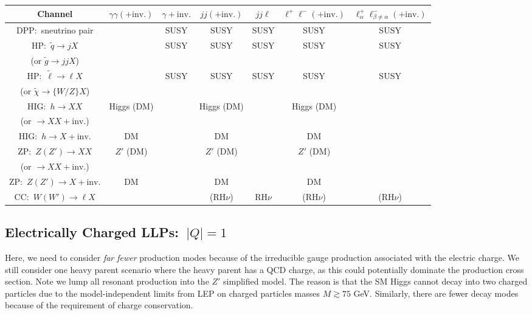 \begin{center}
\begin{tabular}{ |c|c|c|c|c|c|c| } 
 \hline
Channel & $\gamma\gamma(+\mathrm{inv.})$ & $\gamma+\mathrm{inv.}$ & $jj(+\mathrm{inv.})$ & $jj\ell$ & $\ell^+\ell^-(+\mathrm{inv.})$ & $\ell_\alpha^+\ell_{\beta\neq\alpha}^-(+\mathrm{inv.})$\\
\hline\hline
DPP:~sneutrino pair &  & SUSY & SUSY & SUSY & SUSY & SUSY\\
 \hline
 HP:~$\tilde{q}\rightarrow jX$ &  & SUSY & SUSY & SUSY & SUSY & SUSY\\
 (or $\tilde g\rightarrow jjX$) &&&&&&\\
 \hline
HP:~$\tilde{\ell}\rightarrow\ell X$ &  & SUSY & SUSY & SUSY & SUSY & SUSY\\
 (or $\tilde{\chi}\rightarrow \{W/Z\}X$) &&&&&&\\
 \hline 
 HIG:~$h\rightarrow XX$ & Higgs (DM)  &  & Higgs (DM) &  & Higgs (DM) & \\
  (or $\rightarrow XX+\mathrm{inv.}$) &&&&&&\\
 \hline 
 HIG:~$h\rightarrow X+\mathrm{inv.}$ & DM  &  & DM &  & DM & \\
  \hline
   ZP:~$Z(Z')\rightarrow XX$ & $Z'$ (DM)  &  & $Z'$ (DM) &  & $Z'$ (DM) & \\
  (or $\rightarrow XX+\mathrm{inv.}$) &&&&&&\\
 \hline 
 ZP:~$Z(Z')\rightarrow X+\mathrm{inv.}$ & DM  &  & DM &  & DM & \\
  \hline
   CC:~$W(W')\rightarrow \ell X$ &   &  & (RH$\nu$) & RH$\nu$ & (RH$\nu$) & (RH$\nu$) \\
  \hline
\end{tabular}
\end{center}

\subsection{Electrically Charged LLPs:~$|Q|=1$}

Here, we need to consider \emph{far fewer} production modes because of the irreducible gauge production associated with the electric charge. We still consider one heavy parent scenario where the heavy parent has a QCD charge, as this could potentially dominate the production cross section. Note we lump all resonant production into the $Z'$ simplified model.  The reason is that the SM Higgs cannot decay into two charged particles due to the model-independent limits from LEP on charged particles masses $M\gtrsim75$ GeV.   Similarly, there are fewer decay modes because of the requirement of charge conservation.  %

